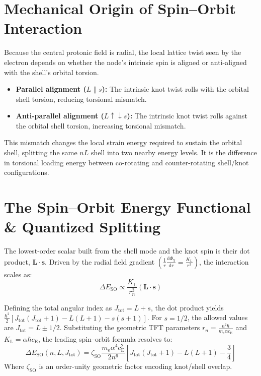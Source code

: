 \section{Mechanical Origin of Spin--Orbit Interaction}
Because the central protonic field is radial, the local lattice twist seen by the electron depends on whether the node's intrinsic spin is aligned or anti-aligned with the shell's orbital torsion.
\begin{itemize}
    \item \textbf{Parallel alignment ($L \parallel s$):} The intrinsic knot twist rolls with the orbital shell torsion, reducing torsional mismatch.
    \item \textbf{Anti-parallel alignment ($L \uparrow\downarrow s$):} The intrinsic knot twist rolls against the orbital shell torsion, increasing torsional mismatch.
\end{itemize}
This mismatch changes the local strain energy required to sustain the orbital shell, splitting the same $nL$ shell into two nearby energy levels. It is the difference in torsional loading energy between co-rotating and counter-rotating shell/knot configurations.

\section{The Spin--Orbit Energy Functional \& Quantized Splitting}
The lowest-order scalar built from the shell mode and the knot spin is their dot product, $\mathbf{L} \cdot \mathbf{s}$. Driven by the radial field gradient $\left( \frac{1}{r} \frac{\mathrm{d}\Phi_{\chi}}{\mathrm{d}r} = \frac{K_{\mathrm{L}}}{r^3} \right)$, the interaction scales as:
\begin{equation}
    \Delta E_{\mathrm{SO}} \propto \frac{K_{\mathrm{L}}}{r_n^3} (\mathbf{L} \cdot \mathbf{s})
\end{equation}

Defining the total angular index as $J_{\mathrm{tot}} = L + s$, the dot product yields $\frac{\hbar^2}{2} [J_{\mathrm{tot}}(J_{\mathrm{tot}}+1) - L(L+1) - s(s+1)]$. For $s = 1/2$, the allowed values are $J_{\mathrm{tot}} = L \pm 1/2$. Substituting the geometric TFT parameters $r_n = \frac{n^2 \hbar}{m_{\mathrm{e}} \alpha c_{\mathrm{E}}}$ and $K_{\mathrm{L}} = \alpha\hbar c_{\mathrm{E}}$, the leading spin--orbit formula resolves to:
\begin{equation}
    \Delta E_{\mathrm{SO}}(n, L, J_{\mathrm{tot}}) = \zeta_{\mathrm{SO}} \frac{m_{\mathrm{e}} \alpha^4 c_{\mathrm{E}}^2}{2n^6} \left[ J_{\mathrm{tot}}(J_{\mathrm{tot}}+1) - L(L+1) - \frac{3}{4} \right]
\end{equation}
Where $\zeta_{\mathrm{SO}}  $ is an order-unity geometric factor encoding knot/shell overlap.

